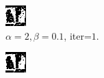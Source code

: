 \documentclass{article}
\begin{document}
\begin{figure}[t]
\centering
\begin{subfigure}[t]{0.27\textwidth}
  \centering
  \includegraphics[width=\textwidth]{ii_alpha_2_beta_0.1_iterations_2.bmp}
  \vspace{-0.6cm}
  \caption{$\alpha=2, \beta=0.1$, iter=$1$.}
\end{subfigure}
\begin{subfigure}[t]{0.27\textwidth}
  \centering
  \includegraphics[width=\textwidth]{ii_alpha_5_beta_0.1_iterations_2.bmp}

\end{subfigure}
\end{figure}
\end{document}

